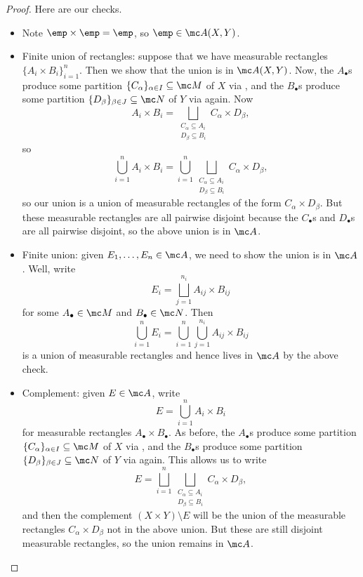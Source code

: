 \documentclass[../notes.tex]{subfiles}
\begin{document}
\begin{proof}
	Here are our checks.
	\begin{itemize}
		\item Note $\emp\times\emp=\emp$, so $\emp\in\mc A(X,Y)$.
		\item Finite union of rectangles: suppose that we have measurable rectangles $\{A_i\times B_i\}_{i=1}^n$. Then we show that the union is in $\mc A(X,Y)$. Now, the $A_\bullet$s produce some partition $\{C_\alpha\}_{\alpha\in I}\subseteq\mc M$ of $X$ via , and the $B_\bullet$s produce some partition $\{D_\beta\}_{\beta\in J}\subseteq\mc N$ of $Y$ via  again. Now
		\[A_i\times B_i=\bigsqcup_{\substack{C_\alpha\subseteq A_i\\D_\beta\subseteq B_i}}C_\alpha\times D_\beta,\]
		so
		\[\bigcup_{i=1}^nA_i\times B_i=\bigcup_{i=1}^n\bigsqcup_{\substack{C_\alpha\subseteq A_i\\D_\beta\subseteq B_i}}C_\alpha\times D_\beta,\]
		so our union is a union of measurable rectangles of the form $C_\alpha\times D_\beta$. But these measurable rectangles are all pairwise disjoint because the $C_\bullet$s and $D_\bullet$s are all pairwise disjoint, so the above union is in $\mc A$.
		\item Finite union: given $E_1,\ldots,E_n\in\mc A$, we need to show the union is in $\mc A$. Well, write
		\[E_i=\bigsqcup_{j=1}^{n_i}A_{ij}\times B_{ij}\]
		for some $A_\bullet\in\mc M$ and $B_\bullet\in\mc N$. Then
		\[\bigcup_{i=1}^nE_i=\bigcup_{i=1}^n\bigcup_{j=1}^{n_i}A_{ij}\times B_{ij}\]
		is a union of measurable rectangles and hence lives in $\mc A$ by the above check.
		\item Complement: given $E\in\mc A$, write
		\[E=\bigcup_{i=1}^nA_i\times B_i\]
		for measurable rectangles $A_\bullet\times B_\bullet$. As before, the $A_\bullet$s produce some partition $\{C_\alpha\}_{\alpha\in I}\subseteq\mc M$ of $X$ via , and the $B_\bullet$s produce some partition $\{D_\beta\}_{\beta\in J}\subseteq\mc N$ of $Y$ via  again. This allows us to write
		\[E=\bigsqcup_{i=1}^n\bigsqcup_{\substack{C_\alpha\subseteq A_i\\D_\beta\subseteq B_i}}C_\alpha\times D_\beta,\]
		and then the complement $(X\times Y)\setminus E$ will be the union of the measurable rectangles $C_\alpha\times D_\beta$ not in the above union. But these are still disjoint measurable rectangles, so the union remains in $\mc A$.
		\qedhere
	\end{itemize}
\end{proof}
\end{document}
